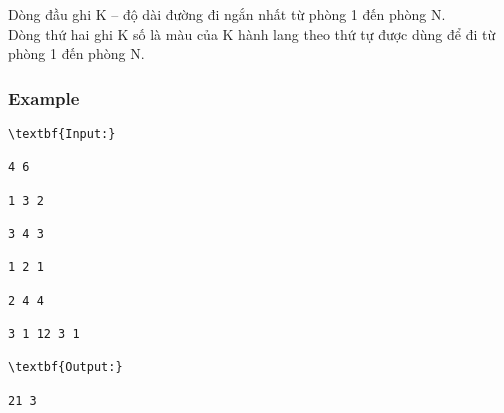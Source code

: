    Dòng đầu ghi K – độ dài đường đi ngắn nhất từ phòng 1 đến phòng N.   
\\   Dòng thứ hai ghi K số là màu của K hành lang theo thứ tự được dùng để đi từ phòng 1 đến phòng N.  

\subsubsection{   Example  }
\begin{verbatim}
\textbf{Input:}

4 6

1 3 2

3 4 3

1 2 1

2 4 4

3 1 12 3 1 

\textbf{Output:}

21 3\end{verbatim}

